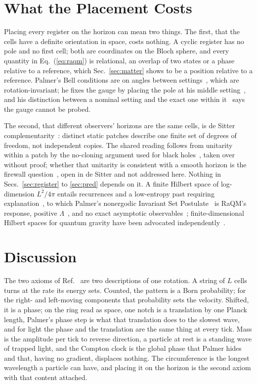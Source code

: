 \documentclass[aps,prd,twocolumn,superscriptaddress,nofootinbib]{revtex4-2}
\begin{document}
\section{What the Placement Costs}
\label{sec:cost}

Placing every register on the horizon can mean two things. The first, that the cells have a definite orientation in space, costs nothing. A cyclic register has no pole and no first cell; both are coordinates on the Bloch sphere, and every quantity in Eq.~(\ref{eq:raqm}) is relational, an overlap of two states or a phase relative to a reference, which Sec.~\ref{sec:matter} shows to be a position relative to a reference. Palmer's Bell conditions are on angles between settings~\cite{palmer2026b}, which are rotation-invariant; he fixes the gauge by placing the pole at his middle setting~\cite{palmer2026c}, and his distinction between a nominal setting and the exact one within it~\cite{palmer2024} says the gauge cannot be probed.

The second, that different observers' horizons are the same cells, is de Sitter complementarity~\cite{susskind1993,bousso1999,dyson2002,banksfischler2001,parikh2003}: distinct static patches describe one finite set of degrees of freedom, not independent copies. The shared reading follows from unitarity within a patch by the no-cloning argument used for black holes~\cite{susskind1994,wootters1982}, taken over without proof; whether that unitarity is consistent with a smooth horizon is the firewall question~\cite{amps2013}, open in de Sitter and not addressed here. Nothing in Secs.~\ref{sec:register} to \ref{sec:pred} depends on it. A finite Hilbert space of log-dimension $L^2/4\pi$ entails recurrences and a low-entropy past requiring explanation~\cite{dyson2002}, to which Palmer's nonergodic Invariant Set Postulate~\cite{palmer2009} is RaQM's response, positive $\Lambda$~\cite{banks2000}, and no exact asymptotic observables~\cite{witten2001}; finite-dimensional Hilbert spaces for quantum gravity have been advocated independently~\cite{buniy2005,bao2017,carroll2023}.

\section{Discussion}
\label{sec:discussion}

The two axioms of Ref.~\cite{korytko2026} are two descriptions of one rotation. A string of $L$ cells turns at the rate its energy sets. Counted, the pattern is a Born probability; for the right- and left-moving components that probability sets the velocity. Shifted, it is a phase; on the ring read as space, one notch is a translation by one Planck length, Palmer's phase step is what that translation does to the slowest wave, and for light the phase and the translation are the same thing at every tick. Mass is the amplitude per tick to reverse direction, a particle at rest is a standing wave of trapped light, and the Compton clock is the global phase that Palmer hides and that, having no gradient, displaces nothing. The circumference is the longest wavelength a particle can have, and placing it on the horizon is the second axiom with that content attached.
\end{document}
